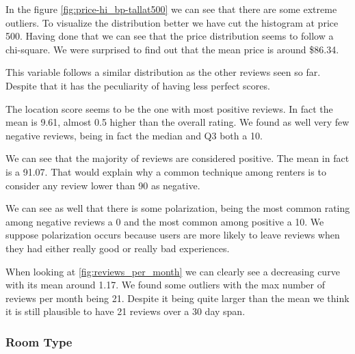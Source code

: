 In the figure \ref{fig:price-hi_bp-tallat500} we can see that there are some extreme outliers. To visualize the distribution better we have cut the histogram at price 500. Having done that we can see that the price distribution seems to follow a chi-square. We were surprised to find out that the mean price is 
around \$86.34.



This variable follows a similar distribution as the other reviews seen so far. Despite that
it has the peculiarity of having less perfect scores.


The location score seems to be the one with most positive reviews. In fact the mean is 9.61, almost 0.5 higher than the overall rating. We found as well
very few negative reviews, being in fact the median and Q3 both a 10.



We can see that the majority of reviews are considered positive. The mean in fact is 
a 91.07. That would explain why a common technique among renters is to consider 
any review lower than 90 as negative. 

We can see as well that there is some polarization, being the most common rating among 
negative reviews a 0 and the most common among positive a 10. We suppose polarization occurs
because users are more likely to leave reviews when they had either really good or 
really bad experiences.



When looking at \ref{fig:reviews_per_month} we can clearly see a decreasing curve with its mean around 1.17. We found some outliers with the max number of reviews per month being 21. Despite it being quite larger than the mean we think it is still plausible to have 21 reviews over a 30 day span.


\pagebreak
\subsubsection{Room Type}

